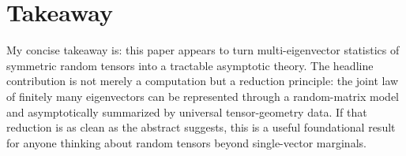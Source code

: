 \documentclass[11pt]{article}
\begin{document}
\section*{Takeaway}
My concise takeaway is: this paper appears to turn multi-eigenvector statistics of symmetric random tensors into a tractable asymptotic theory. The headline contribution is not merely a computation but a reduction principle: the joint law of finitely many eigenvectors can be represented through a random-matrix model and asymptotically summarized by universal tensor-geometry data. If that reduction is as clean as the abstract suggests, this is a useful foundational result for anyone thinking about random tensors beyond single-vector marginals.
\end{document}
